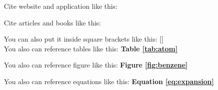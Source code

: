 Cite website and application like this: \hspace{1cm}
\cite{williams_gnuplot_nodate}

Cite articles and books like this: \hspace{1cm}
\cite{hohenberg1964inhomogeneous}

You can also put it inside square brackets like this: \hspace{1cm}
[\cite{hohenberg1964inhomogeneous}]   \\

You also can reference tables like this: \hspace{1cm} 
\textbf{Table \ref{tab:atom}}


You also can reference figure like this: \hspace{1cm} 
\textbf{Figure \ref{fig:benzene}}


You also can reference equations like this: \hspace{1cm} 
\textbf{Equation \ref{eq:expansion}} \\

















